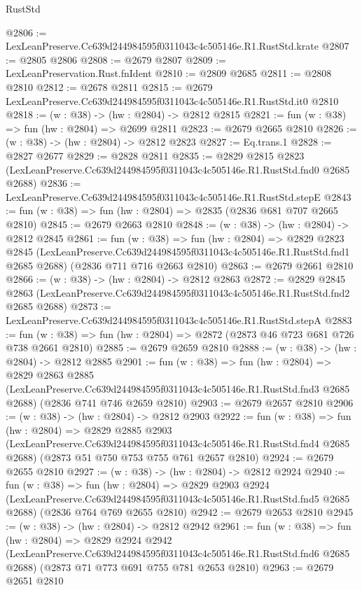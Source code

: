 \begin{lexlean}{RustStd}
\begin{coremodule}
@2806 := LexLeanPreserve.Cc639d244984595f0311043c4c505146e.R1.RustStd.krate
@2807 := @2805 @2806
@2808 := @2679 @2807
@2809 := LexLeanPreservation.Rust.fnIdent
@2810 := @2809 @2685
@2811 := @2808 @2810
@2812 := @2678 @2811
@2815 := @2679 LexLeanPreserve.Cc639d244984595f0311043c4c505146e.R1.RustStd.it0 @2810
@2818 := (w : @38) -> (hw : @2804) -> @2812 @2815
@2821 := fun (w : @38) => fun (hw : @2804) => @2699 @2811
@2823 := @2679 @2665 @2810
@2826 := (w : @38) -> (hw : @2804) -> @2812 @2823
@2827 := Eq.trans.{1}
@2828 := @2827 @2677
@2829 := @2828 @2811
@2835 := @2829
    @2815
    @2823
    (LexLeanPreserve.Cc639d244984595f0311043c4c505146e.R1.RustStd.fnd0 @2685 @2688)
@2836 := LexLeanPreserve.Cc639d244984595f0311043c4c505146e.R1.RustStd.stepE
@2843 := fun (w : @38) => fun (hw : @2804) => @2835 (@2836 @681 @707 @2665 @2810)
@2845 := @2679 @2663 @2810
@2848 := (w : @38) -> (hw : @2804) -> @2812 @2845
@2861 := fun (w : @38) =>
  fun (hw : @2804) =>
  @2829
    @2823
    @2845
    (LexLeanPreserve.Cc639d244984595f0311043c4c505146e.R1.RustStd.fnd1 @2685 @2688)
    (@2836 @711 @716 @2663 @2810)
@2863 := @2679 @2661 @2810
@2866 := (w : @38) -> (hw : @2804) -> @2812 @2863
@2872 := @2829
    @2845
    @2863
    (LexLeanPreserve.Cc639d244984595f0311043c4c505146e.R1.RustStd.fnd2 @2685 @2688)
@2873 := LexLeanPreserve.Cc639d244984595f0311043c4c505146e.R1.RustStd.stepA
@2883 := fun (w : @38) => fun (hw : @2804) => @2872 (@2873 @46 @723 @681 @726 @738 @2661 @2810)
@2885 := @2679 @2659 @2810
@2888 := (w : @38) -> (hw : @2804) -> @2812 @2885
@2901 := fun (w : @38) =>
  fun (hw : @2804) =>
  @2829
    @2863
    @2885
    (LexLeanPreserve.Cc639d244984595f0311043c4c505146e.R1.RustStd.fnd3 @2685 @2688)
    (@2836 @741 @746 @2659 @2810)
@2903 := @2679 @2657 @2810
@2906 := (w : @38) -> (hw : @2804) -> @2812 @2903
@2922 := fun (w : @38) =>
  fun (hw : @2804) =>
  @2829
    @2885
    @2903
    (LexLeanPreserve.Cc639d244984595f0311043c4c505146e.R1.RustStd.fnd4 @2685 @2688)
    (@2873 @51 @750 @753 @755 @761 @2657 @2810)
@2924 := @2679 @2655 @2810
@2927 := (w : @38) -> (hw : @2804) -> @2812 @2924
@2940 := fun (w : @38) =>
  fun (hw : @2804) =>
  @2829
    @2903
    @2924
    (LexLeanPreserve.Cc639d244984595f0311043c4c505146e.R1.RustStd.fnd5 @2685 @2688)
    (@2836 @764 @769 @2655 @2810)
@2942 := @2679 @2653 @2810
@2945 := (w : @38) -> (hw : @2804) -> @2812 @2942
@2961 := fun (w : @38) =>
  fun (hw : @2804) =>
  @2829
    @2924
    @2942
    (LexLeanPreserve.Cc639d244984595f0311043c4c505146e.R1.RustStd.fnd6 @2685 @2688)
    (@2873 @71 @773 @691 @755 @781 @2653 @2810)
@2963 := @2679 @2651 @2810

\end{coremodule}
\end{lexlean}
